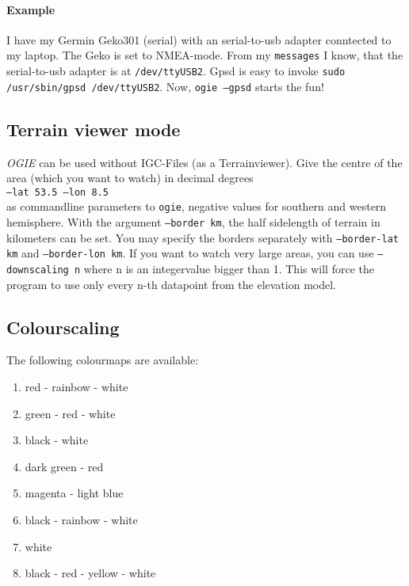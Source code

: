 \paragraph{Example}
I have my Germin Geko301 (serial) with an serial-to-usb adapter conntected to my laptop. The Geko is set to NMEA-mode. From my \texttt{messages} I know, that the serial-to-usb adapter is at \texttt{/dev/ttyUSB2}. Gpsd is easy to invoke \texttt{sudo /usr/sbin/gpsd /dev/ttyUSB2}.
Now, \texttt{ogie --gpsd} starts the fun!









\subsection{Terrain viewer mode}

\emph{OGIE} can be used without IGC-Files (as a Terrainviewer).
Give the centre of the area (which you want to watch) in decimal degrees \\
\texttt{--lat 53.5  --lon 8.5} \\
as commandline parameters to \texttt{ogie}, negative values for southern and western  hemisphere.
With the argument \texttt{--border km}, the half sidelength of terrain in kilometers can be set. You may specify the borders separately with \texttt{--border-lat km}  and \texttt{--border-lon km}.
If you want to watch very large areas, you can use
\texttt{--downscaling n}
where n is an integervalue bigger than 1. This will force the program to use
only every n-th datapoint from the elevation model.



\subsection{Colourscaling}
\label{color}

The following colourmaps are available:

\begin{enumerate}
\item  red - rainbow - white
\item  green - red - white
\item  black - white
\item  dark green - red
\item  magenta - light blue
\item  black - rainbow - white
\item  white
\item  black - red - yellow - white
\end{enumerate}

